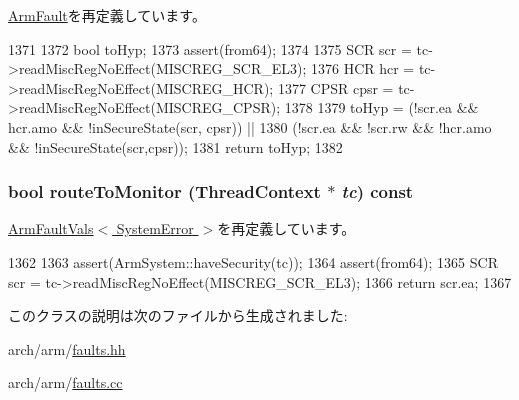 \hyperlink{classArmISA_1_1ArmFault_a6fa7b734487c2a8da04a28ace414a355}{ArmFault}を再定義しています。


\begin{DoxyCode}
1371 {
1372     bool toHyp;
1373     assert(from64);
1374 
1375     SCR scr = tc->readMiscRegNoEffect(MISCREG_SCR_EL3);
1376     HCR hcr  = tc->readMiscRegNoEffect(MISCREG_HCR);
1377     CPSR cpsr = tc->readMiscRegNoEffect(MISCREG_CPSR);
1378 
1379     toHyp = (!scr.ea && hcr.amo && !inSecureState(scr, cpsr)) ||
1380             (!scr.ea && !scr.rw && !hcr.amo && !inSecureState(scr,cpsr));
1381     return toHyp;
1382 }
\end{DoxyCode}
\hypertarget{classArmISA_1_1SystemError_afd7a21fdb010230ad53094254739dde8}{
\subsubsection[{routeToMonitor}]{\setlength{\rightskip}{0pt plus 5cm}bool routeToMonitor ({\bf ThreadContext} $\ast$ {\em tc}) const}}
\label{classArmISA_1_1SystemError_afd7a21fdb010230ad53094254739dde8}


\hyperlink{classArmISA_1_1ArmFaultVals_a9a0a467b98f43890c1d89d1d59a5923c}{ArmFaultVals$<$ SystemError $>$}を再定義しています。


\begin{DoxyCode}
1362 {
1363     assert(ArmSystem::haveSecurity(tc));
1364     assert(from64);
1365     SCR scr = tc->readMiscRegNoEffect(MISCREG_SCR_EL3);
1366     return scr.ea;
1367 }
\end{DoxyCode}


このクラスの説明は次のファイルから生成されました:\begin{DoxyCompactItemize}
\item 
arch/arm/\hyperlink{arch_2arm_2faults_8hh}{faults.hh}\item 
arch/arm/\hyperlink{arch_2arm_2faults_8cc}{faults.cc}\end{DoxyCompactItemize}
